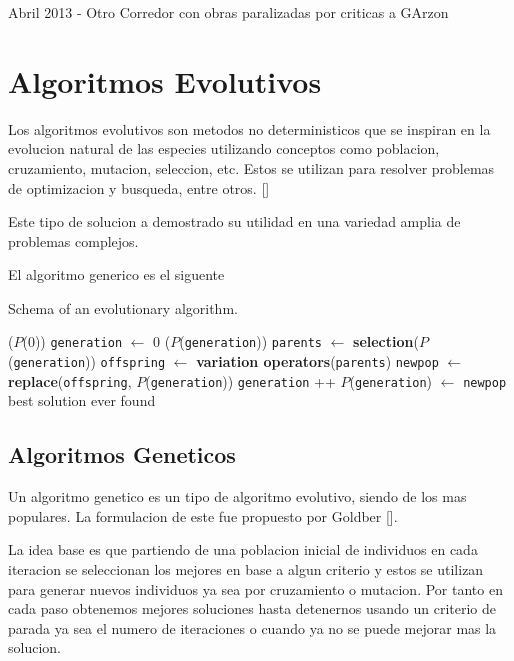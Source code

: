 Abril 2013 - Otro Corredor con obras paralizadas por criticas a GArzon





\section{Algoritmos Evolutivos}
Los algoritmos evolutivos son metodos no deterministicos que se inspiran en la evolucion natural de las especies utilizando conceptos como poblacion, cruzamiento, mutacion, seleccion, etc. Estos se utilizan para resolver problemas de optimizacion y busqueda, entre otros. []


Este tipo de solucion a demostrado su utilidad en una variedad amplia de problemas complejos.

El algoritmo generico es el siguente

\begin{algorithm}[!ht]
	\caption{Schema of an evolutionary algorithm.}
	\label{Alg:diagramEA}
	\begin{algorithmic} [1]
		($P$(0))
		\STATE \texttt{generation} $\leftarrow$ 0
		($P$(\texttt{generation}))
		\STATE \texttt{parents} $\leftarrow$ {\bf selection}($P$(\texttt{generation}))
		\STATE \texttt{offspring} $\leftarrow$ {\bf variation operators}(\texttt{parents})
		\STATE \texttt{newpop} $\leftarrow$ {\bf replace}(\texttt{offspring}, $P$(\texttt{generation}))
		\STATE \texttt{generation} ++
		\STATE $P$(\texttt{generation}) $\leftarrow$ \texttt{newpop}
		\ENDWHILE
		 best solution ever found
	\end{algorithmic}
\end{algorithm}

\subsection{Algoritmos Geneticos}
Un algoritmo genetico es un tipo de algoritmo evolutivo, siendo de los mas populares. La formulacion de este fue propuesto por Goldber [].

La idea base es que partiendo de una poblacion inicial de individuos en cada iteracion se seleccionan los mejores en base a algun criterio y estos se utilizan para generar nuevos individuos ya sea por cruzamiento o mutacion. Por tanto en cada paso obtenemos mejores soluciones hasta detenernos usando un criterio de parada ya sea el numero de iteraciones o cuando ya no se puede mejorar mas la solucion.

